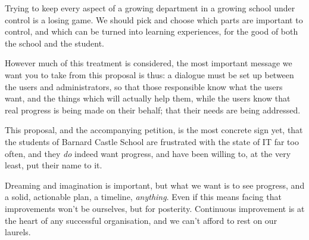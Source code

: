 \documentclass[a4paper,leqno,titlepage]{article}
\begin{document}
Trying to keep every aspect of a growing department in a growing school
under control is a losing game. We should pick and choose which parts
are important to control, and which can be turned into learning experiences,
for the good of both the school and the student.


However much of this treatment is considered, the most important message we
want you to take from this proposal is thus: a dialogue must be set up between
the users and administrators, so that those responsible know what the users want,
and the things which will actually help them, while the users know that real
progress is being made on their behalf; that their needs are being addressed.


This proposal, and the accompanying petition, is the most
concrete sign yet, that the students of Barnard Castle School are
frustrated with the state of IT far too often, and they \emph{do} indeed want
progress, and have been willing to, at the very least, put their name to it.


Dreaming and imagination is important, but what we want is to see progress,
and a solid, actionable plan, a timeline, \emph{anything}. Even if this means
facing that improvements won't be ourselves, but for posterity.
Continuous improvement is at the heart of any successful organisation,
and we can't afford to rest on our laurels.
\end{document}
